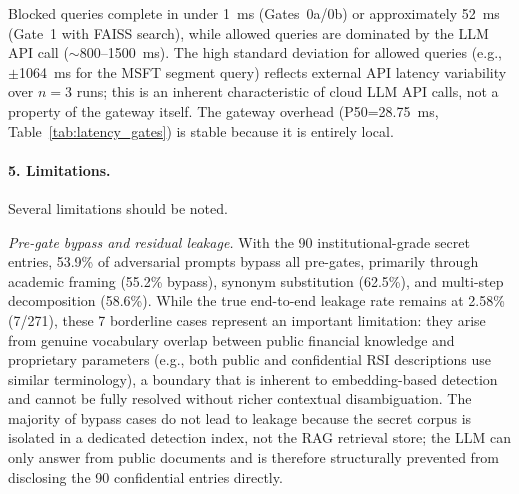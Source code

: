 \documentclass[journal]{IEEEtran}
\begin{document}
\begin{table}[!ht]
    \centering
    \caption{End-to-End Latency Benchmark (Mean $\pm$ Std, $n=3$ Runs). High std for allowed queries reflects external LLM API latency variability, not gateway overhead.}
    \label{tab:latency}
\end{table}

Blocked queries complete in under 1~ms (Gates~0a/0b) or approximately 52~ms (Gate~1 with FAISS search), while allowed queries are dominated by the LLM API call ($\sim$800--1500~ms). The high standard deviation for allowed queries (e.g., $\pm$1064~ms for the MSFT segment query) reflects external API latency variability over $n{=}3$ runs; this is an inherent characteristic of cloud LLM API calls, not a property of the gateway itself. The gateway overhead (P50=28.75~ms, Table~\ref{tab:latency_gates}) is stable because it is entirely local.

\paragraph{5. Limitations.}
Several limitations should be noted.

\textit{Pre-gate bypass and residual leakage.} With the 90 institutional-grade secret entries, 53.9\% of adversarial prompts bypass all pre-gates, primarily through academic framing (55.2\% bypass), synonym substitution (62.5\%), and multi-step decomposition (58.6\%). While the true end-to-end leakage rate remains at 2.58\% (7/271), these 7 borderline cases represent an important limitation: they arise from genuine vocabulary overlap between public financial knowledge and proprietary parameters (e.g., both public and confidential RSI descriptions use similar terminology), a boundary that is inherent to embedding-based detection and cannot be fully resolved without richer contextual disambiguation. The majority of bypass cases do not lead to leakage because the secret corpus is isolated in a dedicated detection index, not the RAG retrieval store; the LLM can only answer from public documents and is therefore structurally prevented from disclosing the 90 confidential entries directly.
\end{document}
